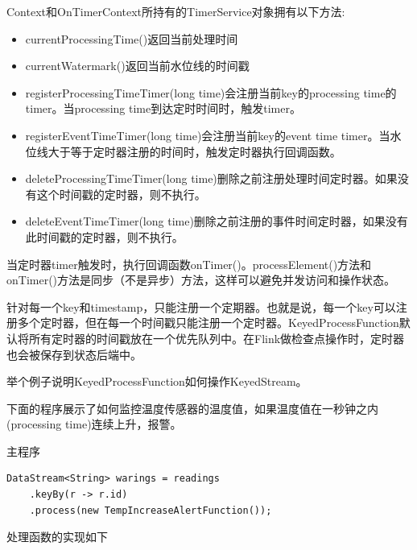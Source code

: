 \documentclass[cn,11pt,chinese]{elegantbook}
\begin{document}
Context和OnTimerContext所持有的TimerService对象拥有以下方法:

\begin{itemize}
    \item currentProcessingTime()返回当前处理时间
    \item currentWatermark()返回当前水位线的时间戳
    \item registerProcessingTimeTimer(long time)会注册当前key的processing time的timer。当processing time到达定时时间时，触发timer。
    \item registerEventTimeTimer(long time)会注册当前key的event time timer。当水位线大于等于定时器注册的时间时，触发定时器执行回调函数。
    \item deleteProcessingTimeTimer(long time)删除之前注册处理时间定时器。如果没有这个时间戳的定时器，则不执行。
    \item deleteEventTimeTimer(long time)删除之前注册的事件时间定时器，如果没有此时间戳的定时器，则不执行。
\end{itemize}

当定时器timer触发时，执行回调函数onTimer()。processElement()方法和onTimer()方法是同步（不是异步）方法，这样可以避免并发访问和操作状态。

针对每一个key和timestamp，只能注册一个定期器。也就是说，每一个key可以注册多个定时器，但在每一个时间戳只能注册一个定时器。KeyedProcessFunction默认将所有定时器的时间戳放在一个优先队列中。在Flink做检查点操作时，定时器也会被保存到状态后端中。

举个例子说明KeyedProcessFunction如何操作KeyedStream。

下面的程序展示了如何监控温度传感器的温度值，如果温度值在一秒钟之内(processing time)连续上升，报警。

主程序

\begin{verbatim}
DataStream<String> warings = readings
    .keyBy(r -> r.id)
    .process(new TempIncreaseAlertFunction());
\end{verbatim}

处理函数的实现如下
\end{document}
